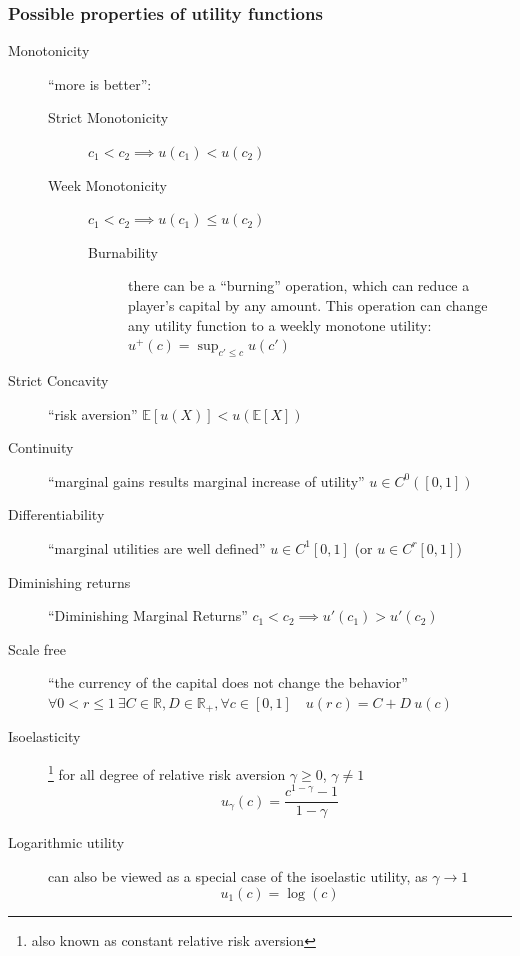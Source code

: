 \documentclass{article}
\theoremstyle{definition}
\begin{document}
\subsubsection{Possible properties of utility functions}

\begin{description}
   \item[Monotonicity] ``more is better'':
    \begin{description}
    \item[Strict Monotonicity] $c_1 < c_2 \implies u(c_1) < u(c_2)$ 
    \item[Week Monotonicity] $c_1 < c_2 \implies u(c_1) \le u(c_2)$
    \begin{description}
        \item[Burnability] there can be a ``burning'' operation, which can reduce a player's capital by any amount. This operation can change any utility function to a weekly monotone utility: $u^{+}(c) = \sup_{c' \le c} u(c')$
    \end{description}
    \end{description}
    
   \item[Strict Concavity] ``risk aversion'' $\mathbb{E}[u(X)] < u(\mathbb{E}[X])$

   \item[Continuity] ``marginal gains results marginal increase of utility'' $u \in C^0([0,1])$

   \item[Differentiability] ``marginal utilities are well defined'' $u \in C^1[0,1]$ (or $u \in C^r[0,1]$)

    \item[Diminishing returns] ``Diminishing Marginal Returns'' $c_1 < c_2 \implies u'(c_1) > u'(c_2)$ 

    \item[Scale free] ``the currency of the capital does not change the behavior'' $\forall 0 < r \le 1 \ \exists C \in \mathbb{R}, D \in \mathbb{R}_{+}, \forall c \in [0,1] \quad u(r \ c) = C + D \ u(c)$ 

    \item[Isoelasticity] \footnote{also known as constant relative risk aversion} for all degree of relative risk aversion \cite{book:Arrow,paper:Pratt} $\gamma \ge 0$, $\gamma \ne 1$
    \begin{equation}
        u_\gamma(c) = \frac{c^{1-\gamma}-1}{1-\gamma}
    \end{equation}

    \item[Logarithmic utility] can also be viewed as a special case of the isoelastic utility, as $\gamma \to 1$
    \begin{equation}
        u_1(c) = \log(c)
    \end{equation}
   
\end{description}
\end{document}

